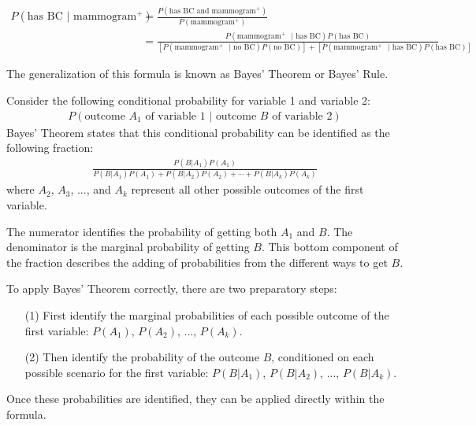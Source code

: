 \begin{small}
\begin{align*}
P(\text{has BC } | \text{ mammogram$^+$})
&= \frac{P(\text{has BC and mammogram$^+$})}{P(\text{mammogram$^+$})} \\
&= \frac{P(\text{mammogram$^+$ } | \text{ has BC})  P(\text{has BC})}
{[P(\text{mammogram$^+$ } | \text{ no BC}) P(\text{no BC})] + [P(\text{mammogram$^+$ } | \text{ has BC}) P(\text{has BC})]}
\end{align*}
\end{small}

The generalization of this formula is known as Bayes' Theorem or Bayes' Rule.

\begin{termBox}{
Consider the following conditional probability for variable 1 and variable 2:\vspace{-1.5mm}
\begin{align*}
P(\text{outcome $A_1$ of variable 1 } | \text{ outcome $B$ of variable 2})
\end{align*}
Bayes' Theorem states that this conditional probability can be identified as the following fraction:\vspace{-1.5mm}
\begin{align}
\frac{P(B | A_1) P(A_1)}
	{P(B | A_1) P(A_1) + P(B | A_2) P(A_2) + \cdots + P(B | A_k) P(A_k)}
	\label{equationOfBayesTheorem}
\end{align}
where $A_2$, $A_3$, ..., and $A_k$ represent all other possible outcomes of the first variable.}
\end{termBox}

The numerator identifies the probability of getting both $A_1$ and $B$. The denominator is the marginal probability of getting $B$. This bottom component of the fraction describes the adding of probabilities from the different ways to get $B$. 

To apply Bayes' Theorem correctly, there are two preparatory steps:
\begin{enumerate}
\setlength{\itemsep}{0mm}
\item[(1)] First identify the marginal probabilities of each possible outcome of the first variable: $P(A_1)$, $P(A_2)$, ..., $P(A_k)$.
\item[(2)] Then identify the probability of the outcome $B$, conditioned on each possible scenario for the first variable: $P(B | A_1)$, $P(B | A_2)$, ..., $P(B | A_k)$.
\end{enumerate}
Once these probabilities are identified, they can be applied directly within the formula.

